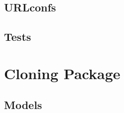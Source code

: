 \documentclass[letterpaper,10pt,english]{sphinxmanual}
\begin{document}
\subsection{URLconfs}
\label{api:id3}

\subsection{Tests}
\label{api:id4}

\section{Cloning Package}
\label{api:module-experimentdb.cloning}\label{api:cloning-package}

\subsection{Models}
\label{api:id5}\label{api:module-experimentdb.cloning.models}
\end{document}
